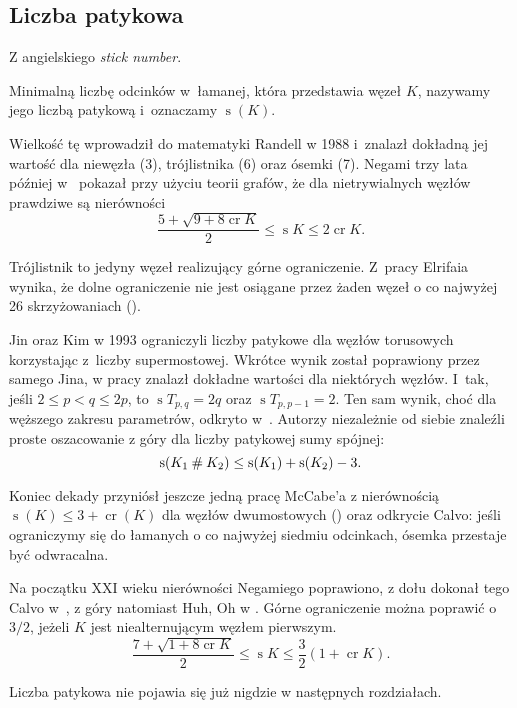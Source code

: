 
\subsection{Liczba patykowa} %
\label{sub:stick_index}
Z angielskiego \emph{stick number}.

\begin{definition}
	Minimalną liczbę odcinków w~łamanej, która przedstawia węzeł $K$, nazywamy jego liczbą patykową i~oznaczamy $\operatorname{s}(K)$.
\end{definition}

Wielkość tę wprowadził do matematyki Randell w 1988 i~znalazł dokładną jej wartość dla niewęzła (3), trójlistnika (6) oraz ósemki (7).
Negami trzy lata później w~\cite{negami91} pokazał przy użyciu teorii grafów, że dla nietrywialnych węzłów prawdziwe są nierówności
\begin{equation}
    \frac{5+\sqrt{9 + 8 \operatorname{cr} K}}{2} \le \operatorname{s} K \le 2 \operatorname{cr} K.
\end{equation}

Trójlistnik to jedyny węzeł realizujący górne ograniczenie.
Z~pracy Elrifaia wynika, że dolne ograniczenie nie jest osiągane przez żaden węzeł o co najwyżej 26 skrzyżowaniach (\cite{elrifai06}).

Jin oraz Kim w 1993 ograniczyli liczby patykowe dla węzłów torusowych korzystając z~liczby supermostowej.
Wkrótce wynik został poprawiony przez samego Jina, w pracy \cite{jin97} znalazł dokładne wartości dla niektórych węzłów.
I~tak, jeśli $2 \le p < q \le 2p$, to $\operatorname{s} T_{p,q} = 2q$ oraz $\operatorname{s} T_{p, p-1} = 2$.
Ten sam wynik, choć dla węższego zakresu parametrów, odkryto w~\cite{greilsheimer97}.
Autorzy niezależnie od siebie znaleźli proste oszacowanie z góry dla liczby patykowej sumy spójnej:
\begin{equation}
	\operatorname{s}(K_1 \mathbin{\#} K_2) \le \operatorname{s}(K_1) + \operatorname{s}(K_2) - 3.
\end{equation}

Koniec dekady przyniósł jeszcze jedną pracę McCabe'a z nierównością $\operatorname{s}(K) \le 3 + \operatorname{cr} (K)$ dla węzłów dwumostowych (\cite{mccabe98}) oraz odkrycie Calvo: jeśli ograniczymy się do łamanych o co najwyżej siedmiu odcinkach, ósemka przestaje być odwracalna.

Na początku XXI wieku nierówności Negamiego poprawiono, z dołu dokonał tego Calvo w~\cite{calvo01}, z góry natomiast Huh, Oh w \cite{huh11}.
Górne ograniczenie można poprawić o $3/2$, jeżeli $K$ jest niealternującym węzłem pierwszym.
\begin{equation}
    \frac{7+\sqrt{1 + 8 \operatorname{cr} K}}{2} \le \operatorname{s} K \le \frac{3}{2} (1 + \operatorname{cr} K).
\end{equation}

Liczba patykowa nie pojawia się już nigdzie w następnych rozdziałach.

